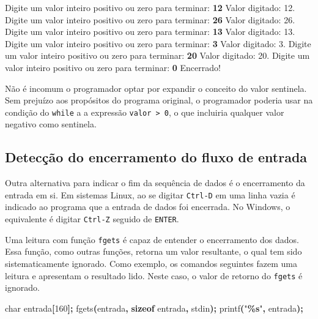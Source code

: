 \documentclass[
  11pt,
  a4paper,
]{scrbook}
\newenvironment{Shaded}{\begin{snugshade}}{\end{snugshade}}
\newcommand{\DataTypeTok}[1]{\textcolor[rgb]{0.13,0.29,0.53}{#1}}
\newcommand{\DecValTok}[1]{\textcolor[rgb]{0.00,0.00,0.81}{#1}}
\newcommand{\KeywordTok}[1]{\textcolor[rgb]{0.13,0.29,0.53}{\textbf{#1}}}
\newcommand{\NormalTok}[1]{#1}
\newcommand{\OperatorTok}[1]{\textcolor[rgb]{0.81,0.36,0.00}{\textbf{#1}}}
\newcommand{\SpecialCharTok}[1]{\textcolor[rgb]{0.81,0.36,0.00}{\textbf{#1}}}
\newcommand{\StringTok}[1]{\textcolor[rgb]{0.31,0.60,0.02}{#1}}
\begin{document}
\begin{Shaded}
\begin{Highlighting}[]
\NormalTok{Digite um valor inteiro positivo ou zero para terminar: }\KeywordTok{ 12 }
\NormalTok{Valor digitado: 12.}
\NormalTok{Digite um valor inteiro positivo ou zero para terminar: }\KeywordTok{ 26 }
\NormalTok{Valor digitado: 26.}
\NormalTok{Digite um valor inteiro positivo ou zero para terminar: }\KeywordTok{ 13 }
\NormalTok{Valor digitado: 13.}
\NormalTok{Digite um valor inteiro positivo ou zero para terminar: }\KeywordTok{ 3 }
\NormalTok{Valor digitado: 3.}
\NormalTok{Digite um valor inteiro positivo ou zero para terminar: }\KeywordTok{ 20 }
\NormalTok{Valor digitado: 20.}
\NormalTok{Digite um valor inteiro positivo ou zero para terminar: }\KeywordTok{ 0 }
\NormalTok{Encerrado!}
\end{Highlighting}
\end{Shaded}

Não é incomum o programador optar por expandir o conceito do valor
sentinela. Sem prejuízo aos propósitos do programa original, o
programador poderia usar na condição do \texttt{while} a a expressão
\texttt{valor\ \textgreater{}\ 0}, o que incluiria qualquer valor
negativo como sentinela.

\subsection{Detecção do encerramento do fluxo de
entrada}\label{detecuxe7uxe3o-do-encerramento-do-fluxo-de-entrada}

Outra alternativa para indicar o fim da sequência de dados é o
encerramento da entrada em si. Em sistemas Linux, ao se digitar
\texttt{Ctrl-D} em uma linha vazia é indicado ao programa que a entrada
de dados foi encerrada. No Windows, o equivalente é digitar
\texttt{Ctrl-Z} seguido de \texttt{ENTER}.

Uma leitura com função \texttt{fgets} é capaz de entender o encerramento
dos dados. Essa função, como outras funções, retorna um valor
resultante, o qual tem sido sistematicamente ignorado. Como exemplo, os
comandos seguintes fazem uma leitura e apresentam o resultado lido.
Neste caso, o valor de retorno do \texttt{fgets} é ignorado.

\begin{Shaded}
\begin{Highlighting}[]
\DataTypeTok{char}\NormalTok{ entrada}\OperatorTok{[}\DecValTok{160}\OperatorTok{];}
\NormalTok{fgets}\OperatorTok{(}\NormalTok{entrada}\OperatorTok{,} \KeywordTok{sizeof}\NormalTok{ entrada}\OperatorTok{,}\NormalTok{ stdin}\OperatorTok{);}
\NormalTok{printf}\OperatorTok{(}\StringTok{"}\SpecialCharTok{\%s}\StringTok{"}\OperatorTok{,}\NormalTok{ entrada}\OperatorTok{);}
\end{Highlighting}
\end{Shaded}
\end{document}
